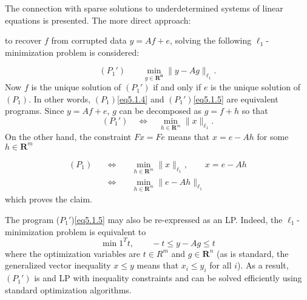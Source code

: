 The connection with sparse solutions to underdetermined systems of linear equations is presented. The more direct approach: 
\begin{center}
    \textcolor[rgb]{1,0,0}{to recover $f$ from corrupted data $y=Af+e$, solving the following $\ell_1$-minimization problem} is considered:
\end{center}
\begin{equation}
    (P_1') \qquad \min\limits_{g \in \mathbf{R^n}} \|y-Ag\|_{\ell_1}.
    \label{eq5.1.5}
\end{equation}
Now $f$ is the \textcolor[rgb]{1,0,0}{unique solution of $(P_1')$} if and only if \textcolor[rgb]{1,0,0}{$e$ is the unique solution of $(P_1)$}. In other words, $(P_1)$\cref{eq5.1.4} and $(P_1')$\cref{eq5.1.5} are equivalent programs. Since $y=Af+e$, $g$ can be decomposed as $g=f+h$ so that
\begin{equation*}
    (P_1') \quad \Leftrightarrow \quad \min\limits_{h \in \mathbf{R}^m} \|x\|_{\ell_1}.
\end{equation*}
On the other hand, the constraint $Fx=Fe$ means that $x=e-Ah$ for some $h \in \mathbf{R}^m$

\begin{eqnarray*}
    (P_1) \quad & \Leftrightarrow & \quad \min\limits_{h \in \mathbf{R}^m} \|x\|_{\ell_1}, \qquad x=e-Ah \\
    & \Leftrightarrow & \quad \min\limits_{h \in \mathbf{R}^m} \|e-Ah\|_{\ell_1}
\end{eqnarray*}
which proves the claim.

The program ($P_1'$)\cref{eq5.1.5} may also be re-expressed as an LP. Indeed, the $\ell_1$-minimization problem is equivalent to 
\begin{equation}
    \min 1^Tt, \qquad -t \leq y-Ag \leq t
    \label{eq5.1.6}
\end{equation}
where the optimization variables are $t \in R^m$ and $g \in \mathbf{R}^n$ (as is standard, the generalized vector inequality $x \leq y$ means that $x_i \leq y_i$ for all $i$). \textcolor[rgb]{1,0,0}{As a result, $(P_1')$ is and LP with inequality constraints and can be solved efficiently using standard optimization algorithms}\cite{Boyd2004}.

